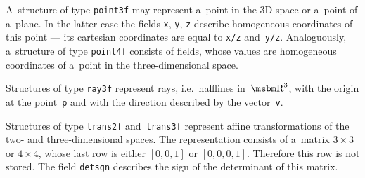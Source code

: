 A~structure of type \texttt{point3f} may represent a~point in the $3$D space
or a~point of a~plane. In the latter case the fields
\texttt{x}, \texttt{y}, \texttt{z} describe homogeneous coordinates
of this point --- its cartesian coordinates are equal to \texttt{x/z}
and~\texttt{y/z}. Analoguously, a~structure of type \texttt{point4f}
consists of fields, whose values are homogeneous coordinates of a~point in the
three-dimensional space.

\newpage
Structures of type \texttt{ray3f} represent rays, i.e.\ halflines in~$\R^3$,
with the origin at the point~\texttt{p} and with the direction described by the
vector~\texttt{v}.

\vspace{\bigskipamount}
Structures of type \texttt{trans2f} and~\texttt{trans3f} represent affine
transformations of the two- and three-dimensional spaces. The representation
consists of a~matrix $3\times 3$ or $4\times 4$, whose last row is either
$[0,0,1]$ or $[0,0,0,1]$. Therefore this row is not stored. The field
\texttt{detsgn} describes the sign of the determinant of this matrix.

